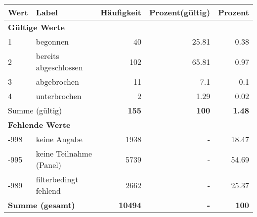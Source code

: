      \begin{longtable}{lXrrr}
     \toprule
     \textbf{Wert} & \textbf{Label} & \textbf{Häufigkeit} & \textbf{Prozent(gültig)} & \textbf{Prozent} \\
     \endhead
     \midrule
     \multicolumn{5}{l}{\textbf{Gültige Werte}}\\

     1 &
     \multicolumn{1}{X}{ begonnen   } &


       \num{40} &
       \num[round-mode=places,round-precision=2]{25,81} &
         \num[round-mode=places,round-precision=2]{0,38} \\

     2 &
     \multicolumn{1}{X}{ bereits abgeschlossen   } &


       \num{102} &
       \num[round-mode=places,round-precision=2]{65,81} &
         \num[round-mode=places,round-precision=2]{0,97} \\

     3 &
     \multicolumn{1}{X}{ abgebrochen   } &


       \num{11} &
       \num[round-mode=places,round-precision=2]{7,1} &
         \num[round-mode=places,round-precision=2]{0,1} \\

     4 &
     \multicolumn{1}{X}{ unterbrochen   } &


       \num{2} &
       \num[round-mode=places,round-precision=2]{1,29} &
         \num[round-mode=places,round-precision=2]{0,02} \\
     \midrule
     \multicolumn{2}{l}{Summe (gültig)} &
       \textbf{\num{155}} &
     \textbf{100} &
       \textbf{\num[round-mode=places,round-precision=2]{1,48}} \\
     \multicolumn{5}{l}{\textbf{Fehlende Werte}}\\
       -998 &
       keine Angabe &
         \num{1938} &
        - &
         \num[round-mode=places,round-precision=2]{18,47} \\
       -995 &
       keine Teilnahme (Panel) &
         \num{5739} &
        - &
         \num[round-mode=places,round-precision=2]{54,69} \\
       -989 &
       filterbedingt fehlend &
         \num{2662} &
        - &
         \num[round-mode=places,round-precision=2]{25,37} \\
     \midrule
     \multicolumn{2}{l}{\textbf{Summe (gesamt)}} &
          \textbf{\num{10494}} &
        \textbf{-} &
        \textbf{100} \\
     \bottomrule
     \end{longtable}
     
